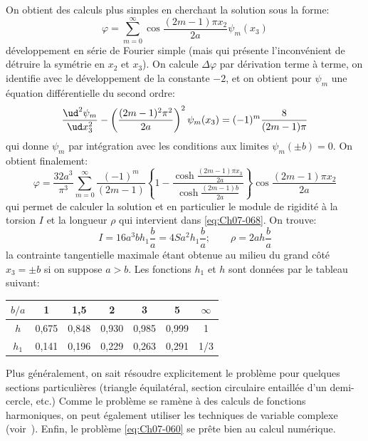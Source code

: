 On obtient des calculs plus simples en cherchant la solution sous la forme: 
\begin{equation}
    \varphi = \sum_{m=0}^{\infty} \cos \frac{(2m-1) \pi x_2}{2a} \psi_m (x_3)    
    \label{eq:Ch07-089}
\end{equation}
développement en série de Fourier simple (mais qui présente l'inconvénient de détruire la symétrie en $x_2$ et $x_3$).
On calcule $\Delta \varphi$ par dérivation terme à terme, on  identifie  avec le développement de la constante $-2$, et on  obtient pour $\psi_m$ une équation différentielle du second ordre:
\begin{displaymath}
    \frac{\ud^2 \psi_m}{\ud x_3^2} - \left( \frac{(2m-1)^2\pi^2}{2a} \right)^2 \psi_m (x_3) = (-1)^m \frac{8}{(2m-1)\pi}
\end{displaymath}
qui donne $\psi_m$ par intégration avec les conditions aux limites $\psi_m(\pm b)=0$.
On obtient finalement:
\begin{equation}
    \varphi = \frac{32a^3}{\pi^3} \sum_{m=0}^{\infty} \frac{(-1)^m}{(2m-1)} \left\{ 1 - \frac{\cosh \frac{(2m-1)\pi x_3}{2a}}{\cosh \frac{(2m-1)b}{2a}} \right\} \cos \frac{(2m-1)\pi x_2}{2a}
    \label{eq:Ch07-090}
\end{equation}
qui permet de calculer la solution et en particulier le module de rigidité à la torsion $I$ et la longueur $\rho$ qui intervient dans \eqref{eq:Ch07-068}.
On trouve: 
\begin{equation}
        I = 16 a^3 b h_1 \frac{b}{a} = 4 S a^2 h_1 \frac{b}{a};\qquad
        \rho = 2 a h \frac{b}{a}
    \label{eq:Ch07-091}
\end{equation}
la contrainte tangentielle maximale étant obtenue au milieu du grand côté $x_3 = \pm b$ si on suppose $a>b$.
Les fonctions $h_1$ et $h$ sont données par le tableau suivant: 
\begin{center}
\begin{tabular}{c|c|c|c|c|c|c}
    $b/a$ & 1 & 1,5 & 2 & 3 & 5 & $\infty$ \\ \hline
    $h$ & 0,675 & 0,848 & 0,930 & 0,985 & 0,999 & 1 \\ \hline
    $h_1$ & 0,141 & 0,196 & 0,229 & 0,263 & 0,291 & 1/3
\end{tabular}
\end{center}

Plus généralement, on sait résoudre explicitement le problème pour quelques sections particulières (triangle équilatéral, section circulaire entaillée d'un demi-cercle, etc.)
Comme le problème se ramène à des calculs de fonctions harmoniques, on peut également utiliser les techniques de variable complexe (voir~\cite{Love-44,Muskhelishvili-53}).
Enfin, le problème \eqref{eq:Ch07-060} se prête bien au calcul numérique.


